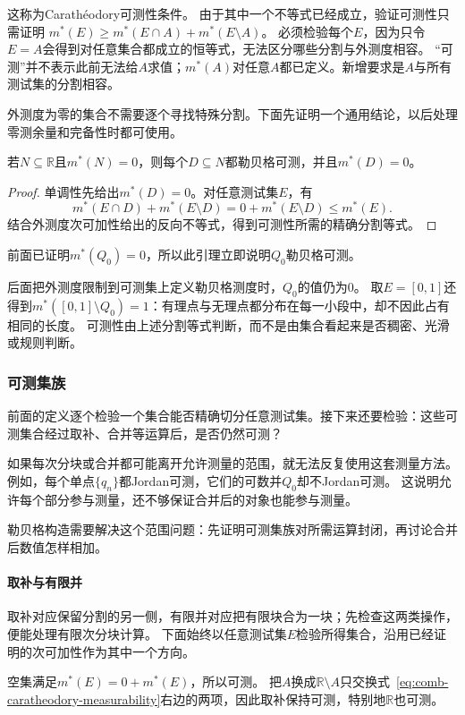 这称为Carathéodory可测性条件。
由于其中一个不等式已经成立，验证可测性只需证明
$m^*(E)\geq m^*(E\cap A)+m^*(E\setminus A)$。
必须检验每个$E$，因为只令$E=A$会得到对任意集合都成立的恒等式，无法区分哪些分割与外测度相容。
“可测”并不表示此前无法给$A$求值；$m^*(A)$对任意$A$都已定义。新增要求是$A$与所有测试集的分割相容。

外测度为零的集合不需要逐个寻找特殊分割。下面先证明一个通用结论，以后处理零测余量和完备性时都可使用。
\begin{lemma}[零外测度集的子集可测]
\label{lem:analysis-zero-outer-measure-measurable}
若$N\subseteq\mathbb R$且$m^*(N)=0$，则每个$D\subseteq N$都勒贝格可测，并且$m^*(D)=0$。
\end{lemma}
\begin{proof}
单调性先给出$m^*(D)=0$。对任意测试集$E$，有
\[
 m^*(E\cap D)+m^*(E\setminus D)=0+m^*(E\setminus D)\leq m^*(E).
\]
结合外测度次可加性给出的反向不等式，得到可测性所需的精确分割等式。
\end{proof}
前面已证明$m^*(Q_0)=0$，所以此引理立即说明$Q_0$勒贝格可测。

后面把外测度限制到可测集上定义勒贝格测度时，$Q_0$的值仍为$0$。
取$E=[0,1]$还得到$m^*([0,1]\setminus Q_0)=1$：有理点与无理点都分布在每一小段中，却不因此占有相同的长度。
可测性由上述分割等式判断，而不是由集合看起来是否稠密、光滑或规则判断。

\subsubsection{可测集族}

前面的定义逐个检验一个集合能否精确切分任意测试集。接下来还要检验：这些可测集合经过取补、合并等运算后，是否仍然可测？

如果每次分块或合并都可能离开允许测量的范围，就无法反复使用这套测量方法。例如，每个单点$\{q_n\}$都Jordan可测，它们的可数并$Q_0$却不Jordan可测。
这说明允许每个部分参与测量，还不够保证合并后的对象也能参与测量。

勒贝格构造需要解决这个范围问题：先证明可测集族对所需运算封闭，再讨论合并后数值怎样相加。

\paragraph{取补与有限并}

取补对应保留分割的另一侧，有限并对应把有限块合为一块；先检查这两类操作，便能处理有限次分块计算。
下面始终以任意测试集$E$检验所得集合，沿用已经证明的次可加性作为其中一个方向。

空集满足$m^*(E)=0+m^*(E)$，所以可测。
把$A$换成$\mathbb R\setminus A$只交换式~\eqref{eq:comb-caratheodory-measurability}右边的两项，因此取补保持可测，特别地$\mathbb R$也可测。

